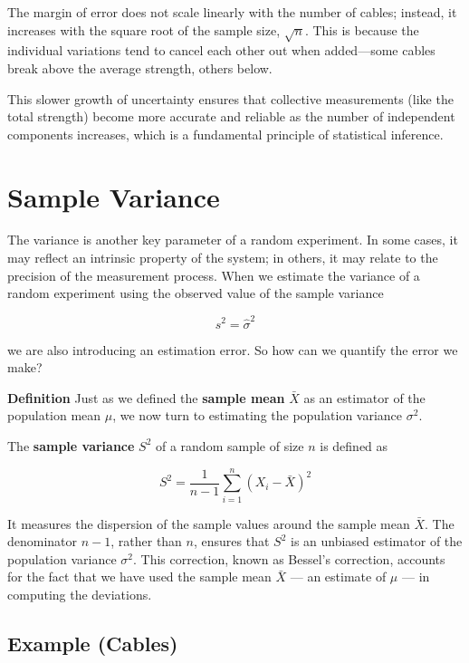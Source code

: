 \documentclass[
]{book}
\begin{document}
The margin of error does not scale linearly with the number of cables; instead, it increases with the square root of the sample size, \(\sqrt{n}\). This is because the individual variations tend to cancel each other out when added---some cables break above the average strength, others below.

This slower growth of uncertainty ensures that collective measurements (like the total strength) become more accurate and reliable as the number of independent components increases, which is a fundamental principle of statistical inference.

\hypertarget{sample-variance-1}{%
\section{Sample Variance}\label{sample-variance-1}}

The variance is another key parameter of a random experiment. In some cases, it may reflect an intrinsic property of the system; in others, it may relate to the precision of the measurement process. When we estimate the variance of a random experiment using the observed value of the sample variance

\[
s^2 = \hat{\sigma}^2
\]

we are also introducing an estimation error. So how can we quantify the error we make?

\textbf{Definition}
Just as we defined the \textbf{sample mean} \(\bar{X}\) as an estimator of the population mean \(\mu\), we now turn to estimating the population variance \(\sigma^2\).

The \textbf{sample variance} \(S^2\) of a random sample of size \(n\) is defined as

\[
S^2 = \frac{1}{n - 1} \sum_{i=1}^n (X_i - \bar{X})^2
\]

It measures the dispersion of the sample values around the sample mean \(\bar{X}\). The denominator \(n - 1\), rather than \(n\), ensures that \(S^2\) is an unbiased estimator of the population variance \(\sigma^2\). This correction, known as Bessel's correction, accounts for the fact that we have used the sample mean \(\bar{X}\) --- an estimate of \(\mu\) --- in computing the deviations.

\hypertarget{example-cables}{%
\subsection{Example (Cables)}\label{example-cables}}
\end{document}

